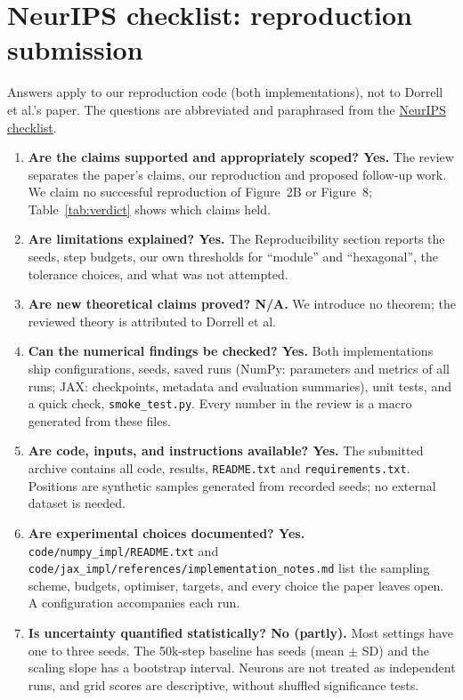 \section*{NeurIPS checklist: reproduction submission}
\noindent Answers apply to our reproduction code (both implementations), not to Dorrell et al.'s paper. The questions are abbreviated and paraphrased from the \href{https://neurips.cc/public/guides/PaperChecklist}{NeurIPS checklist}.
\begin{enumerate}[leftmargin=1.6em,itemsep=2pt]\raggedright
\item \textbf{Are the claims supported and appropriately scoped? Yes.} The review separates the paper's claims, our reproduction and proposed follow-up work. We claim no successful reproduction of Figure~2B or Figure~8; Table~\ref{tab:verdict} shows which claims held.
\item \textbf{Are limitations explained? Yes.} The Reproducibility section reports the seeds, step budgets, our own thresholds for ``module'' and ``hexagonal'', the tolerance choices, and what was not attempted.
\item \textbf{Are new theoretical claims proved? N/A.} We introduce no theorem; the reviewed theory is attributed to Dorrell et al.
\item \textbf{Can the numerical findings be checked? Yes.} Both implementations ship configurations, seeds, saved runs (NumPy: parameters and metrics of all \nJobs{} runs; JAX: checkpoints, metadata and evaluation summaries), unit tests, and a quick check, \texttt{smoke\_test.py}. Every number in the review is a macro generated from these files.
\item \textbf{Are code, inputs, and instructions available? Yes.} The submitted archive contains all code, results, \texttt{README.txt} and \texttt{requirements.txt}. Positions are synthetic samples generated from recorded seeds; no external dataset is needed.
\item \textbf{Are experimental choices documented? Yes.} \texttt{code/numpy\_impl/README.txt} and \texttt{code/jax\_impl/references/implementation\_notes.md} list the sampling scheme, budgets, optimiser, targets, and every choice the paper leaves open. A configuration accompanies each run.
\item \textbf{Is uncertainty quantified statistically? No (partly).} Most settings have one to three seeds. The 50k-step baseline has \baseSeeds{} seeds (mean $\pm$ SD) and the scaling slope has a bootstrap interval. Neurons are not treated as independent runs, and grid scores are descriptive, without shuffled significance tests.

\end{enumerate}
